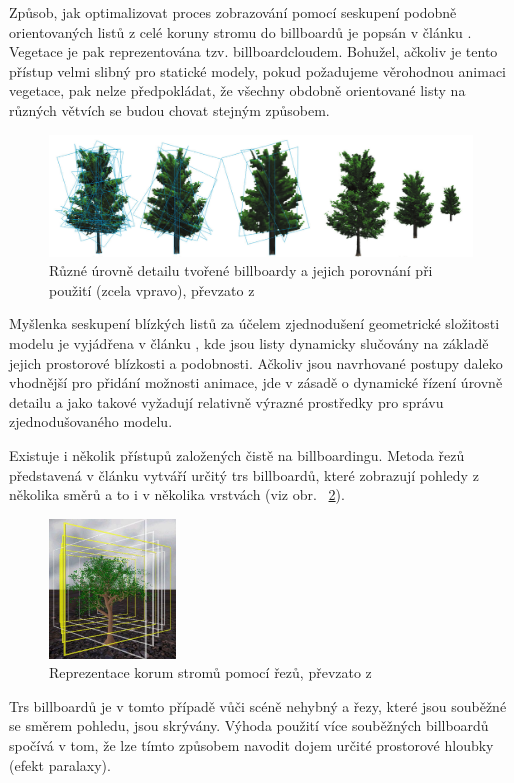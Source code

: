 Způsob, jak optimalizovat proces zobrazování pomocí seskupení podobně orientovaných listů z celé koruny stromu do billboardů je popsán v článku \cite{GIPGSMSL07}. Vegetace je pak reprezentována tzv. billboardcloudem. Bohužel, ačkoliv je tento přístup velmi slibný pro statické modely, pokud požadujeme věrohodnou animaci vegetace, pak nelze předpokládat, že všechny obdobně orientované listy na různých větvích se budou chovat stejným způsobem.
\begin{figure}[here]
\includegraphics[width=1.0\textwidth]{./figures/umlauf_lod.png}
\caption[Různé úrovně detailu tvořené billboardy a jejich porovnání]%
{Různé úrovně detailu tvořené billboardy a jejich porovnání při použití (zcela vpravo), převzato z \cite{Umlauf05} }
\label{fig:UMLAUF_lod}
\end{figure}
Myšlenka seskupení blízkých listů za účelem zjednodušení geometrické složitosti modelu je vyjádřena v článku \cite{Rebollo_07_FRL}, kde jsou listy dynamicky slučovány na základě jejich prostorové blízkosti a podobnosti. Ačkoliv jsou navrhované postupy daleko vhodnější pro přidání možnosti animace, jde v zásadě o dynamické řízení úrovně detailu a jako takové vyžadují relativně výrazné prostředky pro správu zjednodušovaného modelu. 

Existuje i několik přístupů založených čistě na billboardingu. Metoda řezů představená v článku \cite{Jakulin00} vytváří určitý trs billboardů, které zobrazují pohledy z několika směrů a to i v několika vrstvách (viz obr. ~\ref{fig:JAKULIN_slices}).
\begin{figure}[!htb]
\begin{center}
\includegraphics[width=0.3\textwidth]{./figures/slicingJakulin.jpg}
\end{center}
\caption[Reprezentace korum stromů pomocí řezů]%
{Reprezentace korum stromů pomocí řezů, převzato z \cite{Jakulin00} }
\label{fig:JAKULIN_slices}
\end{figure}
 Trs billboardů je v tomto případě vůči scéně nehybný a řezy, které jsou souběžné se směrem pohledu, jsou skrývány. Výhoda použití více souběžných billboardů spočívá v tom, že lze tímto způsobem navodit dojem určité prostorové hloubky (efekt paralaxy).

